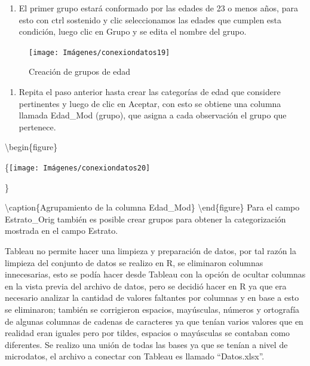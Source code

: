 \documentclass[
]{book}
\providecommand{\tightlist}{%
  \setlength{\itemsep}{0pt}\setlength{\parskip}{0pt}}
\begin{document}
\begin{enumerate}
\def\labelenumi{\arabic{enumi}.}
\setcounter{enumi}{1}
\tightlist
\item
  El primer grupo estará conformado por las edades de 23 o menos años, para esto con ctrl sostenido y clic seleccionamos las edades que cumplen esta condición, luego clic en Grupo y se edita el nombre del grupo.
\end{enumerate}

\begin{figure}

{\centering \texttt{[image: Imágenes/conexiondatos19]} 

}

\caption{Creación de grupos de edad}\label{fig:crearprimergrupo-fig}
\end{figure}

\begin{enumerate}
\def\labelenumi{\arabic{enumi}.}
\setcounter{enumi}{2}
\tightlist
\item
  Repita el paso anterior hasta crear las categorías de edad que considere pertinentes y luego de clic en Aceptar, con esto se obtiene una columna llamada Edad\_Mod (grupo), que asigna a cada observación el grupo que pertenece.
\end{enumerate}

\textbackslash begin\{figure\}

\{\centering \texttt{[image: Imágenes/conexiondatos20]}

\}

\textbackslash caption\{Agrupamiento de la columna Edad\_Mod\}\label{fig:gruposedad-fig}
\textbackslash end\{figure\}
Para el campo Estrato\_Orig también es posible crear grupos para obtener la categorización mostrada en el campo Estrato.

Tableau no permite hacer una limpieza y preparación de datos, por tal razón la limpieza del conjunto de datos se realizo en R, se eliminaron columnas innecesarias, esto se podía hacer desde Tableau con la opción de ocultar columnas en la vista previa del archivo de datos, pero se decidió hacer en R ya que era necesario analizar la cantidad de valores faltantes por columnas y en base a esto se eliminaron; también se corrigieron espacios, mayúsculas, números y ortografía de algunas columnas de cadenas de caracteres ya que tenían varios valores que en realidad eran iguales pero por tildes, espacios o mayúsculas se contaban como diferentes. Se realizo una unión de todas las bases ya que se tenían a nivel de microdatos, el archivo a conectar con Tableau es llamado ``Datos.xlsx''.
\end{document}
